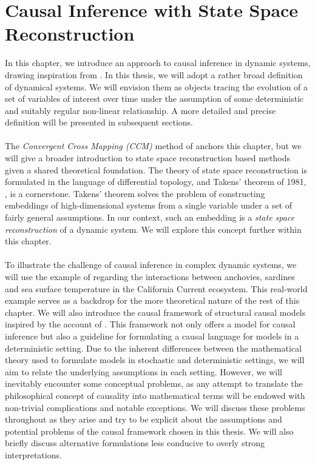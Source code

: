 \documentclass[11pt, a4paper]{memoir}
\theoremstyle{plain}
\theoremstyle{definition}
\begin{document}
\chapter{Causal Inference with State Space Reconstruction}\label{chapTaken}
In this chapter, we introduce an approach to causal inference in dynamic systems, drawing inspiration from \cite{Sugihara}. In this thesis, we will adopt a rather broad definition of dynamical systems. We will envision them as objects tracing the evolution of a set of variables of interest over time under the assumption of some deterministic and suitably regular non-linear relationship. A more detailed and precise definition will be presented in subsequent sections.\\\\ The \textit{Convergent Cross Mapping (CCM)} method of \cite{Sugihara} anchors this chapter, but we will give a broader introduction to state space reconstruction based methods given a shared theoretical foundation. The theory of state space reconstruction is formulated in the language of differential topology, and Takens' theorem of 1981, \cite{Takens}, is a cornerstone. Takens' theorem solves the problem of constructing embeddings of high-dimensional systems from a single variable under a set of fairly general assumptions. In our context, such an embedding is a \textit{state space reconstruction} of a dynamic system. We will explore this concept further within this chapter.\\\\
To illustrate the challenge of causal inference in complex dynamic systems, we will use the example of \cite{Sugihara} regarding the interactions between anchovies, sardines and sea surface temperature in the California Current ecosystem. This real-world example serves as a backdrop for the more theoretical nature of the rest of this chapter. We will also introduce the causal framework of structural causal models inspired by the account of \cite{Peters}. This framework not only offers a model for causal inference but also a guideline for formulating a causal language for models in a deterministic setting. Due to the inherent differences between the mathematical theory used to formulate models in stochastic and deterministic settings, we will aim to relate the underlying assumptions in each setting. However, we will inevitably encounter some conceptual problems, as any attempt to translate the philosophical concept of causality into mathematical terms will be endowed with non-trivial complications and notable exceptions. We will discuss these problems throughout as they arise and try to be explicit about the assumptions and potential problems of the causal framework chosen in this thesis. We will also briefly discuss alternative formulations less conducive to overly strong interpretations.\\\\
\end{document}
